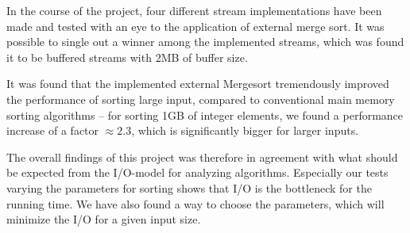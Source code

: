 In the course of the project, four different stream implementations
have been made and tested with an eye to the application of external
merge sort. It was possible to single out a winner among the
implemented streams, which was found it to be buffered streams with
2MB of buffer size.

It was found that the implemented external Mergesort tremendously
improved the performance of sorting large input, compared to
conventional main memory sorting algorithms -- for sorting 1GB of
integer elements, we found a performance increase of a factor $\approx
2.3$, which is significantly bigger for larger inputs.

The overall findings of this project was therefore in agreement with
what should be expected from the I/O-model for analyzing
algorithms. Especially our tests varying the parameters for sorting
shows that I/O is the bottleneck for the running time. We have also
found a way to choose the parameters, which will minimize the I/O for
a given input size.

